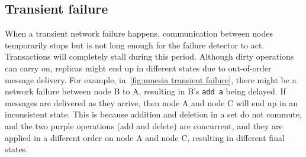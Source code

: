 \subsection{Transient failure} \label{subsec:impl transient failure}

When a transient network failure happens, communication between nodes temporarily
stops but is not long enough for the failure detector to act. Transactions
will completely stall during this period. Although dirty operations can carry
on, replicas might end up in different states due to out-of-order message delivery.
For example, in~\cref{fig:mnesia transient failure}, there might be a
network failure between node B to A, resulting in B's \texttt{add a} being delayed.
If messages are delivered as they arrive, then node A and node C will end up in 
an inconsistent state. This is because addition and deletion in a set 
do not commute, and the two purple operations (add and delete) are concurrent, and
they are applied in a different order on node A and node C, resulting in different final
states.

